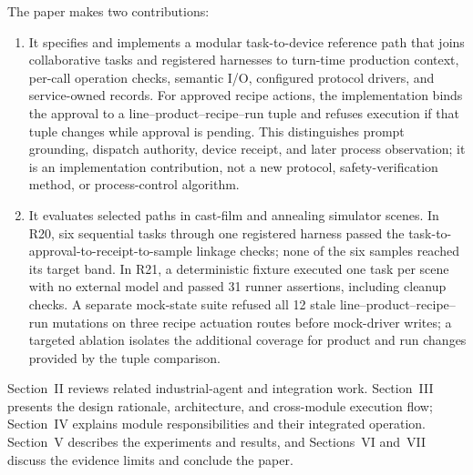 The paper makes two contributions:
\begin{enumerate}
\item It specifies and implements a modular task-to-device reference path that
  joins collaborative tasks and registered harnesses to turn-time production
  context, per-call operation checks, semantic I/O, configured protocol
  drivers, and service-owned records. For approved recipe actions, the
  implementation binds the approval to a line--product--recipe--run tuple and
  refuses execution if that tuple changes while approval is pending. This
  distinguishes prompt grounding, dispatch authority, device receipt, and
  later process observation; it is an implementation contribution, not a new
  protocol, safety-verification method, or process-control algorithm.
\item It evaluates selected paths in cast-film and annealing simulator scenes.
  In R20, six sequential tasks through one registered harness passed the
  task-to-approval-to-receipt-to-sample linkage checks; none of the six samples
  reached its target band. In R21, a deterministic fixture executed one task
  per scene with no external model and passed 31 runner assertions, including
  cleanup checks. A separate mock-state suite refused all 12 stale
  line--product--recipe--run mutations on three recipe actuation routes before
  mock-driver writes; a targeted ablation isolates the additional coverage for
  product and run changes provided by the tuple comparison.
\end{enumerate}

Section~II reviews related industrial-agent and integration work.
Section~III presents the design rationale, architecture, and cross-module
execution flow; Section~IV explains module responsibilities and their
integrated operation. Section~V describes the experiments and results, and
Sections~VI and~VII discuss the evidence limits and conclude the paper.
